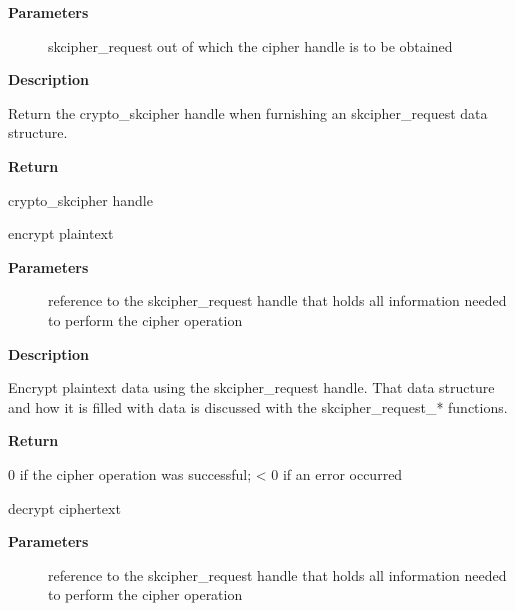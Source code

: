 \documentclass[a4paper,8pt,english]{sphinxmanual}
\begin{document}
\textbf{Parameters}
\begin{description}
\item[{}] \leavevmode
skcipher\_request out of which the cipher handle is to be obtained

\end{description}

\textbf{Description}

Return the crypto\_skcipher handle when furnishing an skcipher\_request
data structure.

\textbf{Return}

crypto\_skcipher handle

\begin{fulllineitems}
\label{crypto/api-skcipher:c.crypto_skcipher_encrypt}
encrypt plaintext

\end{fulllineitems}


\textbf{Parameters}
\begin{description}
\item[{}] \leavevmode
reference to the skcipher\_request handle that holds all information
needed to perform the cipher operation

\end{description}

\textbf{Description}

Encrypt plaintext data using the skcipher\_request handle. That data
structure and how it is filled with data is discussed with the
skcipher\_request\_* functions.

\textbf{Return}

0 if the cipher operation was successful; \textless{} 0 if an error occurred

\begin{fulllineitems}
\label{crypto/api-skcipher:c.crypto_skcipher_decrypt}
decrypt ciphertext

\end{fulllineitems}


\textbf{Parameters}
\begin{description}
\item[{}] \leavevmode
reference to the skcipher\_request handle that holds all information
needed to perform the cipher operation

\end{description}
\end{document}
